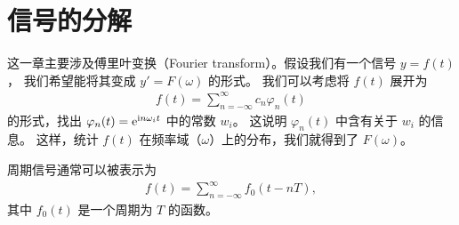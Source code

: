 \section{信号的分解}

这一章主要涉及傅里叶变换（Fourier transform）。假设我们有一个信号 $y = f(t)$，
我们希望能将其变成 $y' = F(\omega)$ 的形式。
我们可以考虑将 $f(t)$ 展开为
\begin{align*}
    f(t) = \sum_{n = -\infty}^{\infty} c_n\varphi_n(t)
\end{align*}
的形式，找出 $\varphi_n(t) = \mathrm{e}^{\mathrm{i} n\omega_i t}$ 中的常数 $w_i$。
这说明 $\varphi_n(t)$ 中含有关于 $w_i$ 的信息。
这样，统计 $f(t)$ 在频率域（$\omega$）上的分布，我们就得到了 $F(\omega)$。

周期信号通常可以被表示为
\begin{align*}
    f(t) = \sum_{n = -\infty}^{\infty} f_0(t - nT),
\end{align*}
其中 $f_0(t)$ 是一个周期为 $T$ 的函数。




